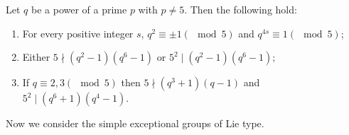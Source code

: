 \documentclass[12pt,reqno]{amsart}
\numberwithin {equation} {section}
\begin{document}
\vspace{0.2cm}
 Let $q$ be a power of a prime $p$ with $p\not=5$. Then the following hold:
 \begin{enumerate}[\rm (1)]
 \item  For every positive integer $s$, $q^2\equiv \pm 1 (\mod 5)$ and $q^{4s}\equiv 1 (\mod 5)$;
 \item Either $5\nmid (q^2-1)(q^6-1)$ or $5^2\mid (q^2-1)(q^6-1)$;
 \item If $q\equiv 2,3 (\mod 5)$ then $5\nmid  (q^3+1)(q-1) $ and $5^2\mid  (q^6+1)(q^4-1) $.
\end{enumerate}

Now we consider the simple exceptional  groups of Lie type.
\end{document}
